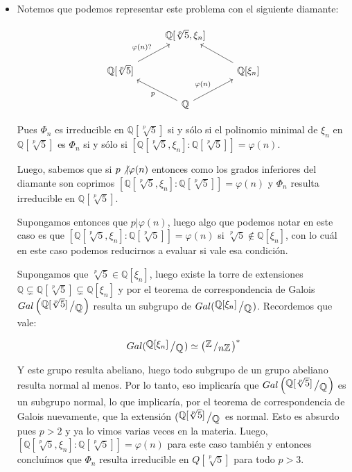\documentclass[11pt]{article}
\newcommand{\Q}{\mathbb{Q}}
\newcommand{\Z}{\mathbb{Z}}
\newcommand{\sett}[1]{\left\lbrace#1\right\rbrace}
\newcommand{\quotient}[2]{{\raisebox{.2em}{$#1$}\left/\raisebox{-.2em}{$#2$}\right.}}
\numberwithin{theorem}{subsection}
\newcommand{\qed}{\nobreak \ifvmode \relax \else
	\ifdim\lastskip<1.5em \hskip-\lastskip
	\hskip1.5em plus0em minus0.5em \fi \nobreak
	\vrule height0.75em width0.5em depth0.25em\fi}
\begin{document}
\begin{enumerate}
\begin{itemize}
		Luego, $\Phi_n$ es irreducible en $\mathbb{F}_p$ con $p \not\vert n$ si y s\'olo si $\left(\quotient{\Z}{n\Z}\right)^*$ es c\'iclico, que de \'Algebra 2 sabemos que pasa si y s\'olo si $n \in \sett{2, 4, l^s, 2l^s}$ con $l$ primo impar o $s \geq 1$; como $12$ no entra en ninguna de esas posibilidades sabemos que $\Phi_{12}$ es reducible en $\mathbb{F}_p$ para $p \neq 2,3$.
		
		Resumiendo vimos que $f$ es irreducible solo si $K = \Q$. \qed
		
		\item Notemos que podemos representar este problema con el siguiente diamante:
		
		\[
		\begin{tikzcd}
		& \Q[\sqrt[p]{5}, \xi_n] & \\
		\Q[\sqrt[p]{5}] \arrow{ru}{\varphi(n)?}  & & \Q[\xi_n] \arrow{lu} \\ \quad
		& \Q \arrow{ru}{\varphi(n)} \arrow{lu}{p}&
		\end{tikzcd}
		\]
		
		Pues $\Phi_n$ es irreducible en $\Q[\sqrt[p]{5}]$ si y s\'olo si el polinomio minimal de $\xi_n$ en $\Q[\sqrt[p]{5}]$ es $\Phi_n$ si y s\'olo si $[\Q[\sqrt[p]{5}, \xi_n]:\Q[\sqrt[p]{5}]] = \varphi(n)$. 
		
		Luego, sabemos que si $p \not\vert \varphi(n)$ entonces como los grados inferiores del diamante son coprimos $[\Q[\sqrt[p]{5}, \xi_n]:\Q[\sqrt[p]{5}]] = \varphi(n)$ y $\Phi_n$ resulta irreducible en $\Q[\sqrt[p]{5}]$.
		
		Supongamos entonces que $p \vert \varphi(n)$, luego algo que podemos notar en este caso es que $[\Q[\sqrt[p]{5}, \xi_n]:\Q[\sqrt[p]{5}]] = \varphi(n)$ si $\sqrt[p]{5} \not\in \Q[\xi_n]$, con lo cu\'al en este caso podemos reducirnos a evaluar si vale esa condici\'on. 
		
		Supongamos que $\sqrt[p]{5} \in \Q[\xi_n]$, luego existe la torre de extensiones $\Q \subsetneq \Q[\sqrt[p]{5}] \subsetneq \Q[\xi_n]$ y por el teorema de correspondencia de Galois $Gal\left(\quotient{ \Q[\sqrt[p]{5}] }{\Q}\right)$ resulta un subgrupo de $Gal(\quotient{\Q[\xi_n]}{\Q})$. Recordemos que vale:
		
		\begin{equation*}
			Gal(\quotient{\Q[\xi_n]}{\Q}) \simeq \left(\quotient{\Z}{n\Z}\right)^*
		\end{equation*}
		
		Y este grupo resulta abeliano, luego todo subgrupo de un grupo abeliano resulta normal al menos. Por lo tanto, eso implicar\'ia que $Gal\left(\quotient{ \Q[\sqrt[p]{5}] }{\Q}\right)$ es un subgrupo normal, lo que implicar\'ia, por el teorema de correspondencia de Galois nuevamente, que la extensi\'on $(\quotient{ \Q[\sqrt[p]{5}] }{\Q}$ es normal. Esto es absurdo pues $p > 2$ y ya lo vimos varias veces en la materia. Luego, $[\Q[\sqrt[p]{5}, \xi_n]:\Q[\sqrt[p]{5}]] = \varphi(n)$ para este caso tambi\'en y entonces conclu\'imos que $\Phi_n$ resulta irreducible en $Q[\sqrt[p]{5}]$ para todo $p>3$.\qed 
		

\end{itemize}
\end{enumerate}
\end{document}

